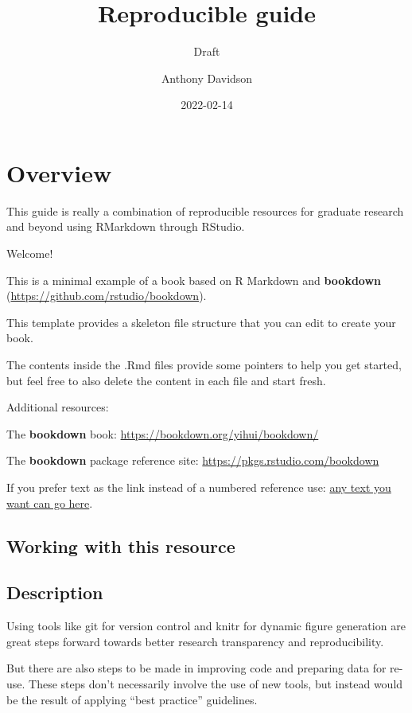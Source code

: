 \documentclass[
]{book}
\title{Reproducible guide}
\subtitle{Draft}
\author{Anthony Davidson}
\date{2022-02-14}
\theoremstyle{definition}
\theoremstyle{definition}
\theoremstyle{definition}
\theoremstyle{definition}
\theoremstyle{remark}
\begin{document}
\maketitle

{
\setcounter{tocdepth}{1}
\tableofcontents
}
\hypertarget{nice-label}{%
\chapter{Overview}\label{nice-label}}

This guide is really a combination of reproducible resources for graduate research and beyond using RMarkdown through RStudio.

Welcome!

This is a minimal example of a book based on R Markdown and \textbf{bookdown} (\url{https://github.com/rstudio/bookdown}).

This template provides a skeleton file structure that you can edit to create your book.

The contents inside the .Rmd files provide some pointers to help you get started, but feel free to also delete the content in each file and start fresh.

Additional resources:

The \textbf{bookdown} book: \url{https://bookdown.org/yihui/bookdown/}

The \textbf{bookdown} package reference site: \url{https://pkgs.rstudio.com/bookdown}

If you prefer text as the link instead of a numbered reference use: \protect\hyperlink{nice-label}{any text you want can go here}.

\hypertarget{working-with-this-resource}{%
\section{Working with this resource}\label{working-with-this-resource}}

\hypertarget{description}{%
\section{Description}\label{description}}

Using tools like git for version control and knitr for dynamic figure generation are great steps forward towards better research transparency and reproducibility.

But there are also steps to be made in improving code and preparing data for re-use. These steps don't necessarily involve the use of new tools, but instead would be the result of applying ``best practice'' guidelines.
\end{document}
